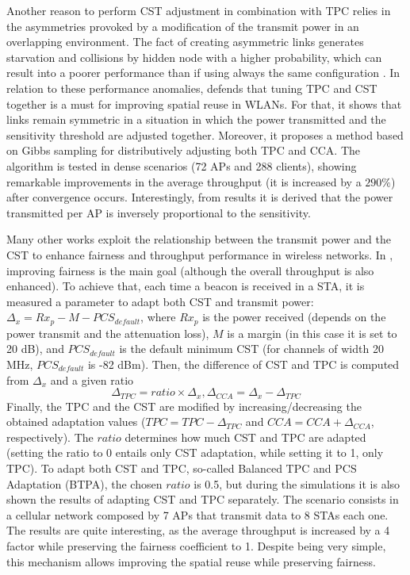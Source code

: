 \documentclass[12pt, a4paper,twoside]{tesi_upf}
\begin{document}
			Another reason to perform CST adjustment in combination with TPC relies in the asymmetries provoked by a modification of the transmit power in an overlapping environment. The fact of creating asymmetric links generates starvation and collisions by hidden node with a higher probability, which can result into a poorer performance than if using always the same configuration \cite{kawadia2005principles}. In relation to these performance anomalies, \cite{mhatre2007interference} defends that tuning TPC and CST together is a must for improving spatial reuse in WLANs. For that, it shows that links remain symmetric in a situation in which the power transmitted and the sensitivity threshold are adjusted together. Moreover, it proposes a method based on Gibbs sampling for distributively adjusting both TPC and CCA. The algorithm is tested in dense scenarios (72 APs and 288 clients), showing remarkable improvements in the average throughput (it is increased by a $290\%$) after convergence occurs. Interestingly, from results it is derived that the power transmitted per AP is inversely proportional to the sensitivity.				
			
			Many other works exploit the relationship between the transmit power and the CST to enhance fairness and throughput performance in wireless networks. In \cite{jamil2015preserving}, improving fairness is the main goal (although the overall throughput is also enhanced). To achieve that, each time a beacon is received in a STA, it is measured a parameter to adapt both CST and transmit power: $\Delta_x = Rx_p - M - PCS_{default}$, where $Rx_p$ is the power received (depends on the power transmit and the attenuation loss), $M$ is a margin (in this case it is set to 20 dB), and $PCS_{default}$ is the default minimum CST (for channels of width 20 MHz, $PCS_{default}$ is -82 dBm). Then, the difference of CST and TPC is computed from $\Delta_x$ and a given ratio
			\begin{equation}
				\Delta_{TPC} = ratio \times \Delta_x, \Delta_{CCA} = \Delta_x - \Delta_{TPC}
				\nonumber
			\end{equation}
			Finally, the TPC and the CST are modified by increasing/decreasing the obtained adaptation values ($TPC = TPC - \Delta_{TPC}$ and $CCA = CCA + \Delta_{CCA}$, respectively). The $ratio$ determines how much CST and TPC are adapted (setting the ratio to 0 entails only CST adaptation, while setting it to 1, only TPC). To adapt both CST and TPC, so-called Balanced TPC and PCS Adaptation (BTPA), the chosen $ratio$ is 0.5, but during the simulations it is also shown the results of adapting CST and TPC separately. The scenario consists in a cellular network composed by 7 APs that transmit data to 8 STAs each one.	The results are quite interesting, as the average throughput is increased by a 4 factor while preserving the fairness coefficient to 1. Despite being very simple, this mechanism allows improving the spatial reuse while preserving fairness. 
			
\end{document}
